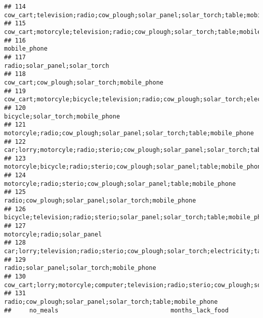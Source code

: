 \documentclass[
]{article}
\begin{document}
\begin{verbatim}
## 114                                                          cow_cart;television;radio;cow_plough;solar_panel;solar_torch;table;mobile_phone
## 115                                                            cow_cart;motorcyle;television;radio;cow_plough;solar_torch;table;mobile_phone
## 116                                                                                                                             mobile_phone
## 117                                                                                                            radio;solar_panel;solar_torch
## 118                                                                                             cow_cart;cow_plough;solar_torch;mobile_phone
## 119                        cow_cart;motorcyle;bicycle;television;radio;cow_plough;solar_torch;electricity;table;sofa_set;mobile_phone;fridge
## 120                                                                                                         bicycle;solar_torch;mobile_phone
## 121                                                                    motorcyle;radio;cow_plough;solar_panel;solar_torch;table;mobile_phone
## 122                                   car;lorry;motorcyle;radio;sterio;cow_plough;solar_panel;solar_torch;table;sofa_set;mobile_phone;fridge
## 123                                                                 motorcyle;bicycle;radio;sterio;cow_plough;solar_panel;table;mobile_phone
## 124                                                                         motorcyle;radio;sterio;cow_plough;solar_panel;table;mobile_phone
## 125                                                                                    radio;cow_plough;solar_panel;solar_torch;mobile_phone
## 126                                                               bicycle;television;radio;sterio;solar_panel;solar_torch;table;mobile_phone
## 127                                                                                                              motorcyle;radio;solar_panel
## 128                                  car;lorry;television;radio;sterio;cow_plough;solar_torch;electricity;table;sofa_set;mobile_phone;fridge
## 129                                                                                               radio;solar_panel;solar_torch;mobile_phone
## 130                    cow_cart;lorry;motorcyle;computer;television;radio;sterio;cow_plough;solar_panel;solar_torch;electricity;mobile_phone
## 131                                                                              radio;cow_plough;solar_panel;solar_torch;table;mobile_phone
##     no_meals                               months_lack_food

\end{verbatim}
\end{document}
